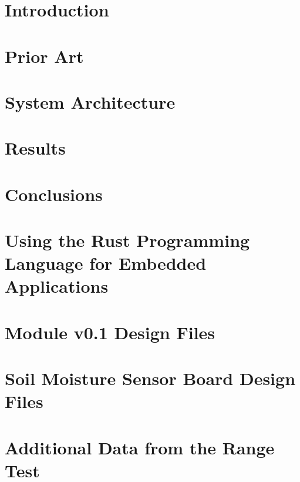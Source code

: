 \documentclass[twoside]{ctuthesis}
\begin{document}
\maketitle


\chapter{\label{chapter:introduction}Introduction}

\chapter{\label{chapter:prior}Prior Art}

\chapter{\label{chapter:architecture}System Architecture}

\chapter{\label{chapter:results}Results}


\chapter{Conclusions}

\printindex

\begin{appendices}
\chapter{\label{chapter:rust}Using the Rust Programming Language for Embedded Applications}

\chapter{\label{chapter:module01-files}Module v0.1 Design Files}

\chapter{\label{chapter:sensor-files}Soil Moisture Sensor Board Design Files}

\chapter{\label{chapter:more-range-test}Additional Data from the Range Test}

\end{appendices}



\end{document}
